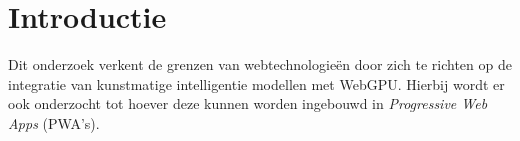 
\section{Introductie}%
\label{sec:introductie}







Dit onderzoek verkent de grenzen van webtechnologieën door zich te richten op de integratie van kunstmatige intelligentie modellen met WebGPU. Hierbij wordt er ook onderzocht tot hoever deze kunnen worden ingebouwd in \textit{Progressive Web Apps} (PWA's). 

